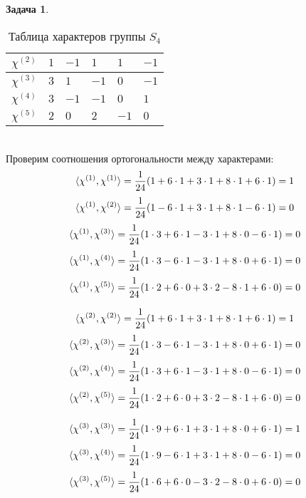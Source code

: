 \documentclass[12pt]{article}
\theoremstyle{definition}
\newtheorem{zad}{Задача}[section]
\begin{document}
\begin{zad}
\begin{table}[h!]
\begin{tabular}{|l|l|l|l|l|l|}
$\chi^{(2)}$ & $1$ & $-1$ & $1$ & $1$ & $-1$ \\ \hline
$\chi^{(3)}$ & $3$ & $1$ & $-1$ & $0$ & $-1$ \\ \hline
$\chi^{(4)}$ & $3$ & $-1$ & $-1$ & $0$ & $1$ \\ \hline
$\chi^{(5)}$ & $2$ &  $0$ & $2$ & $-1$ & $0$  \\ \hline
\end{tabular}
\caption{Таблица характеров группы $S_4$}
\end{table}\\
Проверим соотношения ортогональности между характерами:
\begin{equation}
    \braket{\chi^{(1)},\chi^{(1)}}=\frac{1}{24}(1+6\cdot1+3\cdot 1+8\cdot 1+6\cdot1)=1
\end{equation}
\begin{equation}
    \braket{\chi^{(1)},\chi^{(2)}}=\frac{1}{24}(1-6\cdot1+3\cdot 1+8\cdot 1-6\cdot1)=0
\end{equation}
\begin{equation}
    \braket{\chi^{(1)},\chi^{(3)}}=\frac{1}{24}(1\cdot3+6\cdot1-3\cdot 1+8\cdot0-6\cdot1)=0
\end{equation}
\begin{equation}
    \braket{\chi^{(1)},\chi^{(4)}}=\frac{1}{24}(1\cdot3-6\cdot1-3\cdot 1+8\cdot 0+6\cdot1)=0
\end{equation}
\begin{equation}
    \braket{\chi^{(1)},\chi^{(5)}}=\frac{1}{24}(1\cdot2+6\cdot0+3\cdot2-8\cdot 1+6\cdot0)=0
\end{equation}

\begin{equation}
    \braket{\chi^{(2)},\chi^{(2)}}=\frac{1}{24}(1+6\cdot1+3\cdot 1+8\cdot 1+6\cdot1)=1
\end{equation}
\begin{equation}
    \braket{\chi^{(2)},\chi^{(3)}}=\frac{1}{24}(1\cdot3-6\cdot1-3\cdot 1+8\cdot0+6\cdot1)=0
\end{equation}
\begin{equation}
    \braket{\chi^{(2)},\chi^{(4)}}=\frac{1}{24}(1\cdot3+6\cdot1-3\cdot 1+8\cdot 0-6\cdot1)=0
\end{equation}
\begin{equation}
    \braket{\chi^{(2)},\chi^{(5)}}=\frac{1}{24}(1\cdot2+6\cdot0+3\cdot2-8\cdot 1+6\cdot0)=0
\end{equation}

\begin{equation}
    \braket{\chi^{(3)},\chi^{(3)}}=\frac{1}{24}(1\cdot9+6\cdot1+3\cdot 1+8\cdot0+6\cdot1)=1
\end{equation}
\begin{equation}
    \braket{\chi^{(3)},\chi^{(4)}}=\frac{1}{24}(1\cdot9-6\cdot1+3\cdot 1+8\cdot 0-6\cdot1)=0
\end{equation}
\begin{equation}
    \braket{\chi^{(3)},\chi^{(5)}}=\frac{1}{24}(1\cdot6+6\cdot0-3\cdot2-8\cdot0+6\cdot0)=0
\end{equation}


\end{zad}
\end{document}
